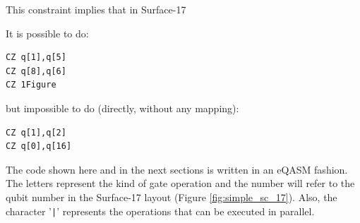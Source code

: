 \documentclass[11pt]{article}
\begin{document}




This constraint implies that in Surface-17





\begin{minipage}[t]{.45\textwidth}

It is possible to do:

\begin{verbatim}
CZ q[1],q[5]
CZ q[8],q[6]
CZ 1Figure\end{verbatim}

\end{minipage}
\hfill %
\begin{minipage}[t]{.45\textwidth}

but impossible to do (directly, without any mapping):

\begin{verbatim}
CZ q[1],q[2]
CZ q[0],q[16]
\end{verbatim}

\end{minipage}

The code shown here and in the next sections is written in an eQASM fashion.
The letters represent the kind of gate operation and the number will refer to the qubit number in the Surface-17 layout (Figure \ref{fig:simple_sc_17}).
Also, the character '\texttt{|}' represents the operations that can be executed in parallel. 






\end{document}
